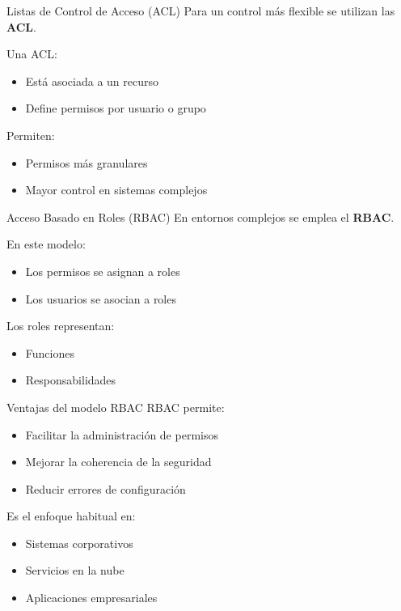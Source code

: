 \documentclass{beamer}
\begin{document}
\begin{frame}{Listas de Control de Acceso (ACL)}
Para un control más flexible se utilizan las \textbf{ACL}.

\vspace{0.3cm}
Una ACL:
\begin{itemize}
    \item Está asociada a un recurso
    \item Define permisos por usuario o grupo
\end{itemize}

\vspace{0.3cm}
Permiten:
\begin{itemize}
    \item Permisos más granulares
    \item Mayor control en sistemas complejos
\end{itemize}
\end{frame}

\begin{frame}{Acceso Basado en Roles (RBAC)}
En entornos complejos se emplea el \textbf{RBAC}.

\vspace{0.3cm}
En este modelo:
\begin{itemize}
    \item Los permisos se asignan a roles
    \item Los usuarios se asocian a roles
\end{itemize}

\vspace{0.3cm}
Los roles representan:
\begin{itemize}
    \item Funciones
    \item Responsabilidades
\end{itemize}
\end{frame}

\begin{frame}{Ventajas del modelo RBAC}
RBAC permite:
\begin{itemize}
    \item Facilitar la administración de permisos
    \item Mejorar la coherencia de la seguridad
    \item Reducir errores de configuración
\end{itemize}

\vspace{0.3cm}
Es el enfoque habitual en:
\begin{itemize}
    \item Sistemas corporativos
    \item Servicios en la nube
    \item Aplicaciones empresariales
\end{itemize}
\end{frame}
\end{document}
